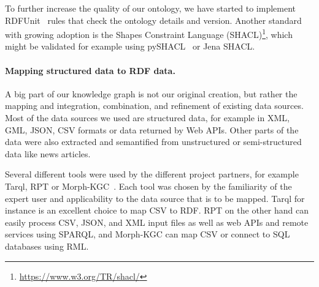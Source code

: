 \documentclass[
hf
]{ceurart}
\begin{document}

To further increase the quality of our ontology, we have started to implement RDFUnit~\cite{rdfunit} rules that check the ontology details and version. Another standard with growing adoption is the Shapes Constraint Language (SHACL)\footnote{\url{https://www.w3.org/TR/shacl/}}, which might be validated for example using pySHACL~\cite{pyshacl} or Jena SHACL.


\paragraph{Mapping structured data to RDF data.}\label{para:mapping}
A big part of our knowledge graph is not our original creation, but rather the mapping and integration, combination, and refinement of existing data sources. Most of the data sources we used are structured data, for example in XML, GML, JSON, CSV formats or data returned by Web APIs. Other parts of the data were also extracted and semantified from unstructured or semi-structured data like news articles.

Several different tools were used by the different project partners, for example Tarql, RPT or Morph-KGC~\cite{arenas2022morph}. Each tool was chosen by the familiarity of the expert user and applicability to the data source that is to be mapped. Tarql for instance is an excellent choice to map CSV to RDF. RPT on the other hand can easily process CSV, JSON, and XML input files as well as web APIs and remote services using SPARQL, and Morph-KGC can map CSV or connect to SQL databases using RML.
\end{document}

